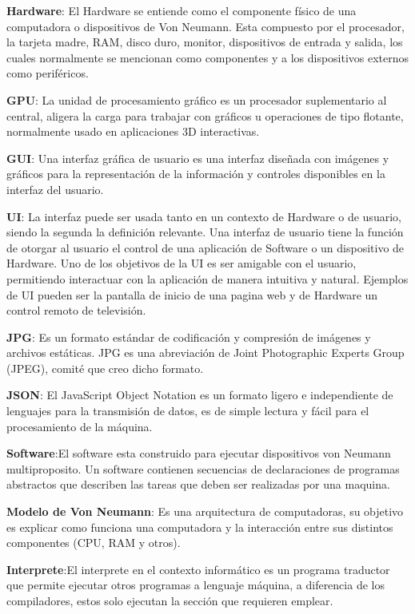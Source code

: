 \textbf{Hardware}: El Hardware se entiende como el componente físico de una computadora o dispositivos de Von Neumann. Esta compuesto por el procesador, la tarjeta madre, RAM, disco duro, monitor, dispositivos de entrada y salida, los cuales normalmente se mencionan como componentes y a los dispositivos externos como periféricos\cite{hardwaredef}.

\textbf{GPU}: La unidad de procesamiento gráfico es un procesador suplementario al  central, aligera la carga para trabajar con gráficos u operaciones de tipo flotante, normalmente usado en aplicaciones 3D interactivas. 

\textbf{GUI}: Una interfaz gráfica de usuario es una interfaz diseñada con imágenes y gráficos para la representación de la información y controles disponibles en la interfaz del usuario.

\textbf{UI}: La interfaz puede ser usada tanto en un contexto de Hardware o de usuario, siendo la segunda la definición relevante.
Una interfaz de usuario tiene la función de otorgar al usuario el control de una aplicación de Software o un dispositivo de Hardware. Uno de los objetivos de la UI es ser amigable con el usuario, permitiendo interactuar con la aplicación de manera intuitiva y natural. Ejemplos de UI pueden ser la pantalla de inicio de una pagina web y de Hardware un control remoto de televisión.

\textbf{JPG}: Es un formato estándar de codificación y compresión de imágenes y archivos estáticas. JPG es una abreviación de Joint Photographic Experts Group (JPEG), comité que creo dicho formato.

\textbf{JSON}: El JavaScript Object Notation es un formato ligero e independiente de lenguajes para la transmisión de datos, es de simple lectura y fácil para el procesamiento de la máquina.

\textbf{Software}:El software esta construido para ejecutar dispositivos von Neumann multiproposito. Un software contienen secuencias de declaraciones de programas abstractos que describen las tareas que deben ser realizadas por una maquina. 

\textbf{Modelo de Von Neumann}: Es una arquitectura de computadoras, su objetivo es explicar como funciona una computadora y la interacción entre sus distintos componentes (CPU, RAM y otros).

\textbf{Interprete}:El interprete en el contexto informático es un programa traductor que permite ejecutar otros programas a lenguaje máquina, a diferencia de los compiladores, estos solo ejecutan la sección que requieren emplear.

